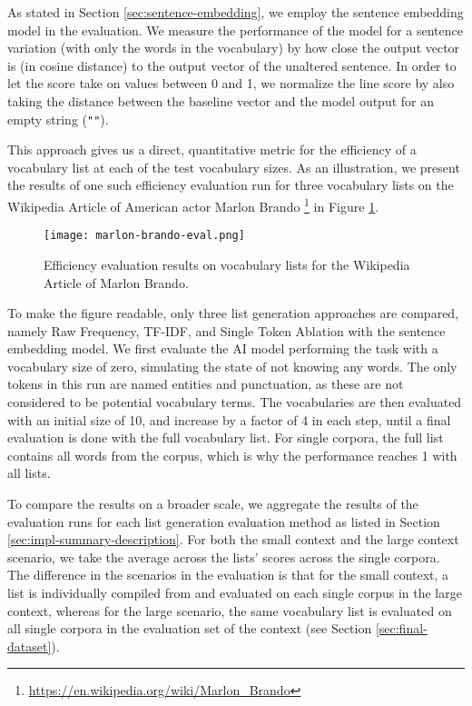 As stated in Section \ref{sec:sentence-embedding}, we employ the sentence embedding model in the evaluation.
We measure the performance of the model for a sentence variation (with only the words in the vocabulary) by how close the output vector is (in cosine distance) to the output vector of the unaltered sentence.
In order to let the score take on values between 0 and 1, we normalize the line score by also taking the distance between the baseline vector and the model output for an empty string (\texttt{""}).

This approach gives us a direct, quantitative metric for the efficiency of a vocabulary list at each of the test vocabulary sizes.
As an illustration, we present the results of one such efficiency evaluation run for three vocabulary lists on the Wikipedia Article of American actor Marlon Brando \footnote{\url{https://en.wikipedia.org/wiki/Marlon_Brando}} in Figure \ref{fig:marlon-brando-eval}.

\begin{figure}[H]
	\centering
	\texttt{[image: marlon-brando-eval.png]}
	\caption{Efficiency evaluation results on vocabulary lists for the Wikipedia Article of Marlon Brando.}
	\label{fig:marlon-brando-eval}
\end{figure}


To make the figure readable, only three list generation approaches are compared, namely Raw Frequency, TF-IDF, and Single Token Ablation with the sentence embedding model.
We first evaluate the AI model performing the task with a vocabulary size of zero, simulating the state of not knowing any words.
The only tokens in this run are named entities and punctuation, as these are not considered to be potential vocabulary terms.
The vocabularies are then evaluated with an initial size of 10, and increase by a factor of 4 in each step, until a final evaluation is done with the full vocabulary list.
For single corpora, the full list contains all words from the corpus, which is why the performance reaches 1 with all lists.

To compare the results on a broader scale, we aggregate the results of the evaluation runs for each list generation evaluation method as listed in Section \ref{sec:impl-summary-description}.
For both the small context and the large context scenario, we take the average across the lists' scores across the single corpora.
The difference in the scenarios in the evaluation is that for the small context, a list is individually compiled from and evaluated on each single corpus in the large context, whereas for the large scenario, the same vocabulary list is evaluated on all single corpora in the evaluation set of the context (see Section \ref{sec:final-dataset}).

